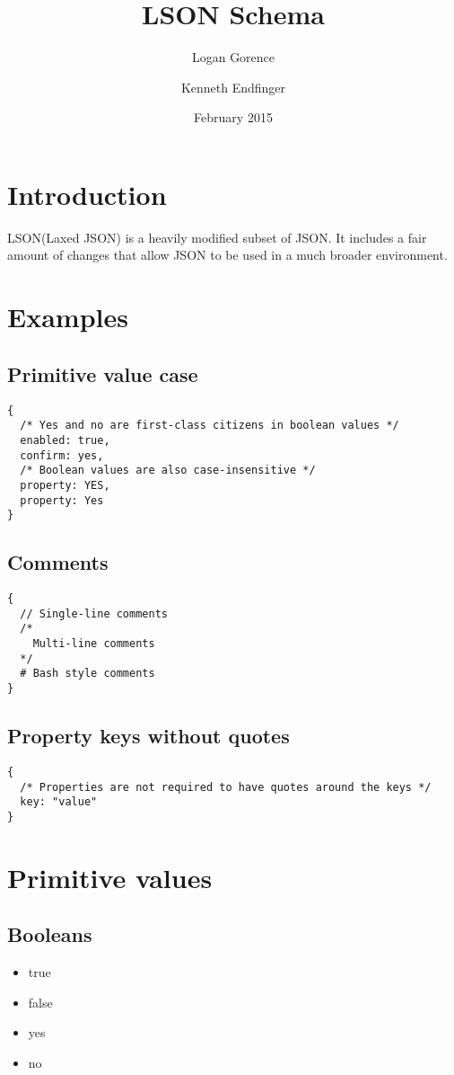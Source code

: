 \documentclass[12pt]{article}
\begin{document}
\title{LSON Schema}
\author{Logan Gorence \and Kenneth Endfinger}
\date{February 2015}
\maketitle
{}
\newpage

\tableofcontents
\newpage

\section{Introduction}
LSON(Laxed JSON) is a heavily modified subset of JSON. It includes a fair amount of changes that allow JSON to be used in a much  broader environment.

\section{Examples}
\subsection{Primitive value case}
\begin{lstlisting}
{
  /* Yes and no are first-class citizens in boolean values */
  enabled: true,
  confirm: yes,
  /* Boolean values are also case-insensitive */
  property: YES,
  property: Yes
}
\end{lstlisting}

\subsection{Comments}
\begin{lstlisting}
{
  // Single-line comments
  /*
    Multi-line comments
  */
  # Bash style comments
}
\end{lstlisting}

\subsection{Property keys without quotes}
\begin{lstlisting}
{
  /* Properties are not required to have quotes around the keys */
  key: "value"
}
\end{lstlisting}

\section{Primitive values}
\subsection{Booleans}
\begin{itemize}
\item true
\item false
\item yes
\item no
\end{itemize}
\end{document}

